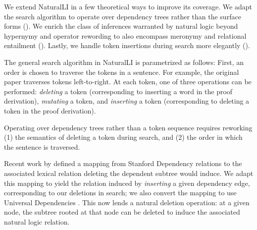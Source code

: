 We extend NaturalLI in a few theoretical ways to improve its 
  coverage.
We adapt the search algorithm to operate over dependency
  trees rather than the surface forms ().
We enrich the class of inferences warranted by natural logic beyond
  hypernymy and operator rewording to also encompass meronymy and
  relational entailment ().
Lastly, we handle token insertions during search more elegantly
  ().

The general search algorithm in NaturalLI is parametrized as follows:
First, an order is chosen to traverse the tokens in a sentence.
For example, the original paper traverses tokens left-to-right.
At each token, one of three operations can be performed:
  \textit{deleting} a token
  (corresponding to inserting a word in the proof derivation),
  \textit{mutating} a token, and \textit{inserting} a token (corresponding
  to deleting a token in the proof derivation).

%
%
Operating over dependency trees rather than a token sequence requires reworking
  (1) the semantics of deleting a token during search, and 
  (2) the order in which the sentence is traversed.


Recent work by  defined a mapping from Stanford
  Dependency relations to the associated lexical relation deleting the
  dependent subtree would induce.
We adapt this mapping to yield the relation induced by \textit{inserting} a
  given dependency edge, corresponding to our deletions in search;
  we also convert the mapping to use Universal Dependencies
  \cite{key:stanford-ud}.
This now lends a natural deletion operation: at a given node, the subtree rooted
  at that node can be deleted to induce the associated natural logic relation.

